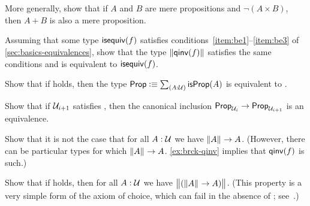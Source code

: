 \begin{ex}\label{ex:disjoint-or}
  More generally, show that if $A$ and $B$ are mere propositions and $\neg(A\times B)$, then $A+B$ is also a mere proposition.
\end{ex}




\begin{ex}\label{ex:brck-qinv}
  Assuming that some type $\mathsf{isequiv}(f)$ satisfies conditions~\ref{item:be1}--\ref{item:be3} of \autoref{sec:basics-equivalences}, show that the type $\mathopen{}\left\Vert \mathsf{qinv}(f)\right\Vert_{}\mathclose{}$ satisfies the same conditions and is equivalent to $\mathsf{isequiv}(f)$.
\end{ex}

\begin{ex}
  Show that if \LEM{} holds, then the type $\prop \defeq \sm{A:\type} \isprop(A)$ is equivalent to \bool.
\end{ex}

\begin{ex}\label{ex:lem-impred}
  Show that if $\mathcal{U}_{i+1}$ satisfies \LEM{}, then the canonical inclusion $\mathsf{Prop}_{\mathcal{U}_i} \to \mathsf{Prop}_{\mathcal{U}_{i+1}}$ is an equivalence.
\end{ex}

\begin{ex}
  Show that it is not the case that for all $A:\mathcal{U}$ we have $\mathopen{}\left\Vert A\right\Vert_{}\mathclose{} \to A$.
  (However, there can be particular types for which $\mathopen{}\left\Vert A\right\Vert_{}\mathclose{}\to A$.
  \autoref{ex:brck-qinv} implies that $\mathsf{qinv}(f)$ is such.)
\end{ex}

\begin{ex}
  Show that if \LEM{} holds, then for all $A:\mathcal{U}$ we have $\bigl\Vert (\mathopen{}\left\Vert A\right\Vert_{}\mathclose{} \to A)\bigr\Vert_{}$.
  (This property is a very simple form of the axiom of choice, which can fail in the absence of \LEM{}; see~\cite{krausgeneralizations}.)
\end{ex}

